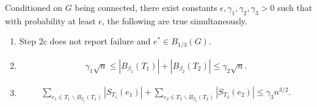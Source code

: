 \begin{lemma} \label{lem:conn:phase-2:step-c:structure-1}
  Conditioned on $G$ being connected, there exist constants $\epsilon,\gamma_1,\gamma_2,\gamma_3>0$ such that with probability at least $\epsilon$, the following are true simultaneously.
  \begin{enumerate}[label=(\roman*)]
    \item\label{item:lem:conn:phase-2:step-c:structure-1:i} Step 2c does not report failure and $e^*\in B_{1/3}(G)$.
    \item\label{item:lem:conn:phase-2:step-c:structure-1:ii}
    \begin{align*}
      \gamma_1 \sqrt n \le \left| B_{\beta_1}(T_1) \right| + \left| B_{\beta_2}(T_2) \right| \le \gamma_2 \sqrt n.
    \end{align*}
    \item\label{item:lem:conn:phase-2:step-c:structure-1:iii}
    \begin{align*}
      \sum_{e_1\in T_1\backslash B_{\beta_1}(T_1)} \left| S_{T_1}(e_1) \right| + \sum_{e_2\in T_2\backslash B_{\beta_2}(T_2)} \left| S_{T_2}(e_2) \right| \le \gamma_3 n^{3/2}.
    \end{align*}
  \end{enumerate}
\end{lemma}
